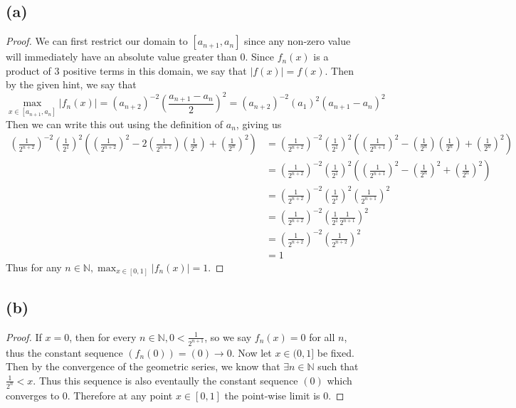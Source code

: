 \documentclass{article}
\theoremstyle{definition}
\begin{document}
\subsection*{(a)}
    \begin{proof}
        We can first restrict our domain to $[a_{n+1}, a_n]$ since any non-zero value will immediately
        have an absolute value greater than 0. Since $f_n(x)$ is a product of 3 positive terms in this domain,
        we say that $|f(x)| = f(x)$. Then by the given hint, we say that
        \[
            \max_{x \in [a_{n+1},a_n]}|f_n(x)| = (a_{n+2})^{-2} \left(\frac{a_{n+1} - a_n}{2}\right)^2 = (a_{n+2})^{-2}(a_1)^2(a_{n+1} - a_n)^2
        \]
        Then we can write this out using the definition of $a_n$, giving us 
        \begin{align*}
            \left(\frac{1}{2^{n+2}}\right)^{-2}\left(\frac{1}{2^1}\right)^2 \left(\left(\frac{1}{2^{n+2}}\right)^2 - 2\left(\frac{1}{2^{n + 1}}\right)\left(\frac{1}{2^n}\right) + \left(\frac{1}{2^n}\right)^2\right)
            &= \left(\frac{1}{2^{n+2}}\right)^{-2}\left(\frac{1}{2^1}\right)^2 \left(\left(\frac{1}{2^{n+1}}\right)^2 - \left(\frac{1}{2^{n}}\right)\left(\frac{1}{2^n}\right) + \left(\frac{1}{2^n}\right)^2\right)\\
            &= \left(\frac{1}{2^{n+2}}\right)^{-2}\left(\frac{1}{2^1}\right)^2 \left(\left(\frac{1}{2^{n+1}}\right)^2 - \left(\frac{1}{2^{n}}\right)^2 + \left(\frac{1}{2^n}\right)^2\right)\\
            &= \left(\frac{1}{2^{n+2}}\right)^{-2}\left(\frac{1}{2^1}\right)^2 \left(\frac{1}{2^{n+1}}\right)^2\\
            &= \left(\frac{1}{2^{n+2}}\right)^{-2}\left(\frac{1}{2^1}\frac{1}{2^{n+1}}\right)^2\\
            &= \left(\frac{1}{2^{n+2}}\right)^{-2}\left(\frac{1}{2^{n+2}}\right)^2\\
            &= 1
        \end{align*}
        Thus for any $n \in \mathbb{N}, \max_{x \in [0,1]}|f_n(x)| = 1$.
    \end{proof}
\subsection*{(b)}
    \begin{proof}
        If $x = 0$, then for every $n \in \mathbb{N}, 0 < \frac{1}{2^{n+1}}$, so we say $f_n(x) = 0$ for all $n$,
        thus the constant sequence $(f_n(0)) = (0) \rightarrow 0$. Now let $x \in (0,1]$ be fixed. Then by the convergence of the
        geometric series, we know that $\exists n \in \mathbb{N}$ such that $\frac{1}{2^n} < x$. Thus this sequence is also eventaully the constant
        sequence $(0)$ which converges to 0. Therefore at any point $x \in [0,1]$ the point-wise limit is 0.
    \end{proof}
\end{document}
